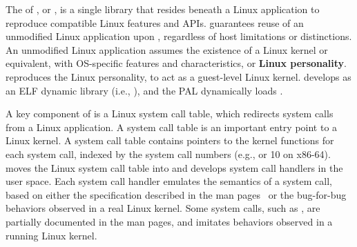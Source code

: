 

The \libos{} of \graphene{}, or 
\thelibos{},
is a single library that resides beneath a Linux application to reproduce compatible Linux features and APIs.
\thelibos{} guarantees reuse of an unmodified Linux application
upon \thehostabi{},
regardless of host limitations or distinctions.
An unmodified Linux application assumes the existence of a Linux kernel or equivalent,
with OS-specific features and characteristics,
or {\bf Linux personality}.
\thelibos{} reproduces the Linux personality,
to act as a guest-level Linux kernel.
\graphene{} develops \thelibos{} as an ELF dynamic library (i.e., ),
and the PAL dynamically loads \thelibos{}.


A key component of \thelibos{}
is a Linux system call table, which redirects system calls from a Linux application.
A system call table is an important entry point to a Linux kernel.
A system call table contains
pointers to the kernel functions for each system call,
indexed by the system call numbers (e.g.,  or 10 on x86-64).
\graphene{} moves the Linux system call table into \thelibos{}
and develops system call handlers in the user space.
Each system call handler emulates
the semantics of a system call,
based on either the specification %
described in the man pages~\cite{linux-man-syscall}
or the bug-for-bug behaviors
observed in a real Linux kernel.
Some system calls, such as , are partially documented
in the man pages, and \thelibos{} imitates behaviors observed in a running Linux kernel.

